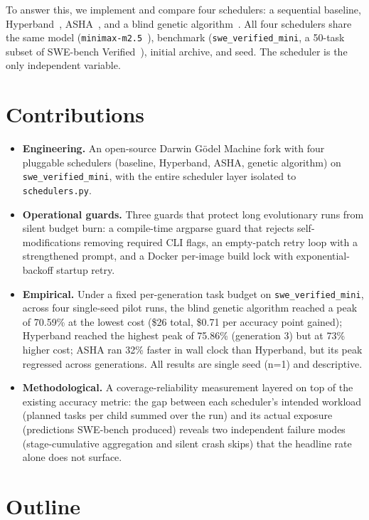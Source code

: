 To answer this, we implement and compare four schedulers: a sequential
baseline, Hyperband~\cite{Li:18}, ASHA~\cite{Li:20}, and a blind
genetic algorithm~\cite{Holland:75}. All four schedulers share the
same model (\texttt{minimax-m2.5}~\cite{MiniMax:25}), benchmark
(\texttt{swe\_verified\_mini}, a 50-task subset of SWE-bench
Verified~\cite{Jimenez:24}), initial archive, and seed. The scheduler is
the only independent variable.

\section{Contributions}

\begin{itemize}
  \item \textbf{Engineering.} An open-source Darwin G{\"o}del Machine
    fork with four pluggable schedulers (baseline, Hyperband, ASHA,
    genetic algorithm) on \texttt{swe\_verified\_mini}, with the entire
    scheduler layer isolated to \texttt{schedulers.py}.
  \item \textbf{Operational guards.} Three guards that protect long
    evolutionary runs from silent budget burn: a compile-time argparse
    guard that rejects self-modifications removing required CLI flags,
    an empty-patch retry loop with a strengthened prompt, and a Docker
    per-image build lock with exponential-backoff startup retry.
  \item \textbf{Empirical.} Under a fixed per-generation task budget on
    \texttt{swe\_verified\_mini}, across four single-seed pilot runs,
    the blind genetic algorithm reached a peak of 70.59\% at the lowest
    cost (\$26 total, \$0.71 per accuracy point gained); Hyperband
    reached the highest peak of 75.86\% (generation 3) but at 73\%
    higher cost; ASHA ran 32\% faster in wall clock than Hyperband, but
    its peak regressed across generations. All results are single seed
    (n=1) and descriptive.
  \item \textbf{Methodological.} A coverage-reliability measurement
    layered on top of the existing accuracy metric: the gap between
    each scheduler's intended workload (planned tasks per child summed
    over the run) and its actual exposure (predictions SWE-bench
    produced) reveals two independent failure modes
    (stage-cumulative aggregation and silent crash skips) that the
    headline rate alone does not surface.
\end{itemize}

\section{Outline}

